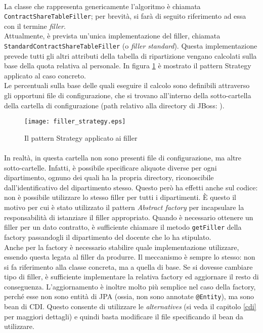 \paragraph{}
La classe che rappresenta genericamente l'algoritmo è chiamata \lstinline{ContractShareTableFiller}; per brevità, si farà di seguito riferimento ad essa con il termine \textsl{filler}. \\
Attualmente, è prevista un'unica implementazione del filler, chiamata \lstinline{StandardContractShareTableFiller} (o \textsl{filler standard}). Questa implementazione prevede tutti gli altri attributi della tabella di ripartizione vengano calcolati sulla base della quota relativa al personale. In figura \ref{filler_strategy} è mostrato il pattern Strategy applicato al caso concreto.\\
Le percentuali sulla base delle quali eseguire il calcolo sono definibili attraverso gli opportuni file di configurazione, che si trovano all'interno della sotto-cartella  della cartella di configurazione (path relativo alla directory di JBoss: ). \\

\begin{figure}[h]
\centering
\texttt{[image: filler\_strategy.eps]}
\caption{Il pattern Strategy applicato ai filler}
\label{filler_strategy}
\end{figure}

\paragraph{}
In realtà, in questa cartella non sono presenti file di configurazione, ma altre sotto-cartelle. Infatti, è possibile specificare aliquote diverse per ogni dipartimento, ognuno dei quali ha la propria directory, riconoscibile dall'identificativo del dipartimento stesso. Questo però ha effetti anche sul codice: non è possibile utilizzare lo stesso filler per tutti i dipartimenti. È questo il motivo per cui è stato utilizzato il pattern \textsl{Abstract factory} per incapsulare la responsabilità di istanziare il filler appropriato. Quando è necessario ottenere un filler per un dato contratto, è sufficiente chiamare il metodo \lstinline{getFiller} della factory passandogli il dipartimento del docente che lo ha stipulato. \\
Anche per la factory è necessario stabilire quale implementazione utilizzare, essendo questa legata al filler da produrre. Il meccanismo è sempre lo stesso: non si fa riferimento alla classe concreta, ma a quella di base. Se si dovesse cambiare tipo di filler, è sufficiente implementare la relativa factory ed aggiornare il resto di conseguenza. L'aggiornamento è inoltre molto più semplice nel caso della factory, perché esse non sono entità di JPA (ossia, non sono annotate \lstinline{@Entity}), ma sono bean di CDI. Questo consente di utilizzare le \textit{alternatives} (si veda il capitolo \ref{cdi} per maggiori dettagli) e quindi basta modificare il file  specificando il bean da utilizzare.\\


